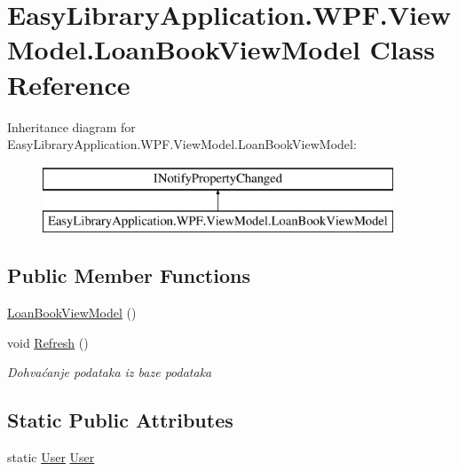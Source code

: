 \hypertarget{class_easy_library_application_1_1_w_p_f_1_1_view_model_1_1_loan_book_view_model}{}\section{Easy\+Library\+Application.\+W\+P\+F.\+View\+Model.\+Loan\+Book\+View\+Model Class Reference}
\label{class_easy_library_application_1_1_w_p_f_1_1_view_model_1_1_loan_book_view_model}
Inheritance diagram for Easy\+Library\+Application.\+W\+P\+F.\+View\+Model.\+Loan\+Book\+View\+Model\+:\begin{figure}[H]
\begin{center}
\leavevmode
\includegraphics[height=2.000000cm]{class_easy_library_application_1_1_w_p_f_1_1_view_model_1_1_loan_book_view_model}
\end{center}
\end{figure}
\subsection*{Public Member Functions}
\begin{DoxyCompactItemize}
\item 
\mbox{\hyperlink{class_easy_library_application_1_1_w_p_f_1_1_view_model_1_1_loan_book_view_model_acd42035b86417cc136c4c89c83240ec8}{Loan\+Book\+View\+Model}} ()
\item 
void \mbox{\hyperlink{class_easy_library_application_1_1_w_p_f_1_1_view_model_1_1_loan_book_view_model_afd1d44a54688705433f7724abf911a8b}{Refresh}} ()
\begin{DoxyCompactList}\small\item\em Dohvaćanje podataka iz baze podataka \end{DoxyCompactList}\end{DoxyCompactItemize}
\subsection*{Static Public Attributes}
\begin{DoxyCompactItemize}
\item 
static \mbox{\hyperlink{class_easy_library_application_1_1_w_p_f_1_1_model_1_1_user}{User}} \mbox{\hyperlink{class_easy_library_application_1_1_w_p_f_1_1_view_model_1_1_loan_book_view_model_ad1f957dfd3a92aa4c254b78fb7256e3a}{User}}
\end{DoxyCompactItemize}
